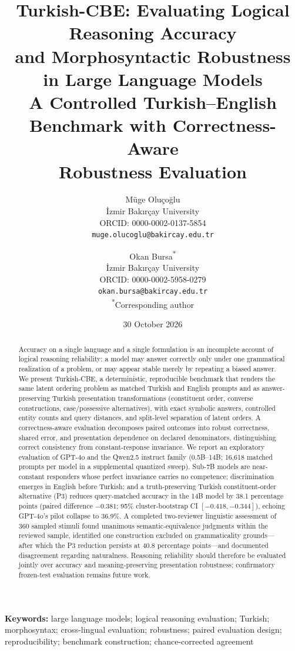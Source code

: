 \documentclass[11pt]{article}
\title{\textbf{Turkish-CBE: Evaluating Logical Reasoning Accuracy\\
and Morphosyntactic Robustness in Large Language Models}\\[1.2ex]
\large A Controlled Turkish--English Benchmark with Correctness-Aware\\
\large Robustness Evaluation}
\author{Müge Oluçoğlu\\
\small İzmir Bakırçay University\\
\small ORCID: 0000-0002-0137-5854\\
\small \texttt{muge.olucoglu@bakircay.edu.tr}
\and
Okan Bursa\textsuperscript{*}\\
\small İzmir Bakırçay University\\
\small ORCID: 0000-0002-5958-0279\\
\small \texttt{okan.bursa@bakircay.edu.tr}\\
\small \textsuperscript{*}Corresponding author}
\date{\small 30 October 2026}
\begin{document}
\maketitle
\thispagestyle{empty}

\begin{abstract}
\noindent
Accuracy on a single language and a single formulation is an incomplete account of logical reasoning
reliability: a model may answer correctly only under one grammatical realization of a problem, or may
appear stable merely by repeating a biased answer. We present Turkish-CBE, a deterministic, reproducible
benchmark that renders the same latent ordering problem as matched Turkish and English prompts and as
answer-preserving Turkish presentation transformations (constituent order, converse constructions,
case/possessive alternatives), with exact symbolic answers, controlled entity counts and query distances,
and split-level separation of latent orders. A correctness-aware evaluation decomposes paired outcomes
into robust correctness, shared error, and presentation dependence on declared denominators,
distinguishing correct consistency from constant-response invariance. We report an exploratory evaluation
of GPT-4o and the Qwen2.5 instruct family (0.5B--14B; 16,618 matched prompts per model in a supplemental
quantized sweep). Sub-7B models are near-constant responders whose perfect invariance carries no
competence; discrimination emerges in English before Turkish; and a truth-preserving Turkish
constituent-order alternative (P3) reduces query-matched accuracy in the 14B model by 38.1 percentage
points (paired difference $-0.381$; 95\% cluster-bootstrap CI $[-0.418, -0.344]$), echoing GPT-4o's pilot
collapse to 36.9\%. A completed two-reviewer linguistic assessment of 360 sampled stimuli found unanimous
semantic-equivalence judgments within the reviewed sample, identified one construction excluded on
grammaticality grounds---after which the P3 reduction persists at 40.8 percentage points---and documented
disagreement regarding naturalness. Reasoning reliability should therefore be evaluated jointly over accuracy and
meaning-preserving presentation robustness; confirmatory frozen-test evaluation remains future work.
\end{abstract}

\vspace{0.6ex}
\noindent\textbf{Keywords:} large language models; logical reasoning evaluation; Turkish;
morphosyntax; cross-lingual evaluation; robustness; paired evaluation design; reproducibility;
benchmark construction; chance-corrected agreement
\end{document}
